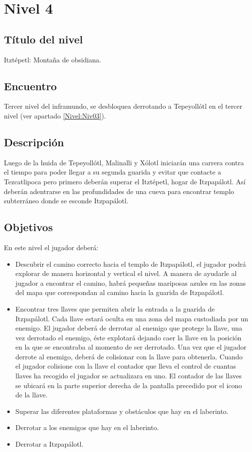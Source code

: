\section{Nivel 4} \label{Nivel:Niv04}
        \subsection{Título del nivel}
        Itztépetl: Montaña de obsidiana.
        \subsection{Encuentro}
Tercer nivel del inframundo, se desbloquea derrotando a Tepeyollótl en el tercer nivel (ver apartado \ref{Nivel:Niv03}).
        \subsection{Descripción}
        Luego de la huida de Tepeyollótl, Malinalli y Xólotl iniciarán una carrera contra el tiempo para poder llegar a su segunda guarida y evitar que contacte a Tezcatlipoca pero primero deberán superar el Itztépetl, hogar de Itzpapálotl. Así deberán adentrarse en las profundidades de una cueva para encontrar templo subterráneo donde se esconde Itzpapálotl. 
        \subsection{Objetivos}
En este nivel el jugador deberá:        
\begin{itemize}
        \item Descubrir el camino correcto hacia el templo de Itzpapálotl, el jugador podrá explorar de manera horizontal y vertical el nivel. A manera de ayudarle al jugador a encontrar el camino, habrá pequeñas mariposas azules en las zonas del mapa que correspondan al camino hacia la guarida de Itzpapálotl. 
        \item Encontrar tres llaves que permiten abrir la entrada a la guarida de Itzpapálotl. Cada llave estará oculta en una zona del mapa custodiada por un enemigo. El jugador deberá de derrotar al enemigo que protege la llave, una vez derrotado el enemigo, éste explotará dejando caer la llave en la posición en la que se encontraba al momento de ser derrotado. Una vez que el jugador derrote al enemigo, deberá de colisionar con la llave para obtenerla. Cuando el jugador colisione con la llave el contador que lleva el control de cuantas llaves ha recogido el jugador se actualizara en uno. El contador de las llaves se ubicará en la parte superior derecha de la pantalla precedido por el icono de la llave. 
        \item Superar las diferentes plataformas y obstáculos que hay en el laberinto. 
        \item Derrotar a los enemigos que hay en el laberinto.
        \item Derrotar a Itzpapálotl.
\end{itemize}
